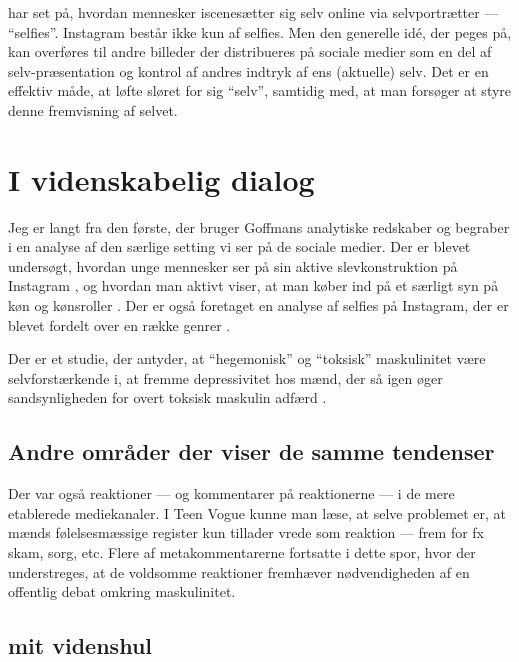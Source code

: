 \citeauthor{sulerSelfPortraitsSelfies2015} har set på, hvordan 
mennesker iscenesætter sig selv online via selvportrætter — 
“selfies”. Instagram består ikke kun af selfies. Men den 
generelle idé, der peges på, kan overføres til andre billeder der 
distribueres på sociale medier som en del af selv-præsentation og
kontrol af andres indtryk af ens (aktuelle) selv. Det er en
effektiv måde, at løfte sløret for sig “selv”, samtidig med, at
man forsøger at styre denne fremvisning af selvet.

\section{I videnskabelig dialog}

Jeg er langt fra den første, der bruger Goffmans analytiske 
redskaber og begraber i en analyse af den særlige setting vi ser 
på de sociale medier. Der er blevet undersøgt, hvordan unge 
mennesker ser på sin aktive slevkonstruktion på Instagram 
\autocite{seehaferNOFILTERExplorationInstagram2017a}, og hvordan 
man aktivt viser, at man køber ind på et særligt syn på køn og 
kønsroller \autocite{bakerGoodMorningFitfam2018}. Der er også 
foretaget en analyse af selfies på Instagram, der er blevet 
fordelt over en række genrer \autocite{MISSING}.

Der er et studie, der antyder, at “hegemonisk” og “toksisk” 
maskulinitet være selvforstærkende i, at fremme depressivitet hos 
mænd, der så igen øger sandsynligheden for overt toksisk maskulin 
adfærd \autocite{MISSING}.

\subsection{Andre områder der viser de samme tendenser} 

Der var også reaktioner — og kommentarer på reaktionerne — i de
mere etablerede mediekanaler. I Teen Vogue kunne man læse, at
selve problemet er, at mænds følelsesmæssige register kun tillader
vrede som reaktion — frem for fx skam, sorg, etc. Flere af
metakommentarerne fortsatte i dette spor, hvor der understreges,
at de voldsomme reaktioner fremhæver nødvendigheden af en
offentlig debat omkring maskulinitet. 

\subsection{mit videnshul}

